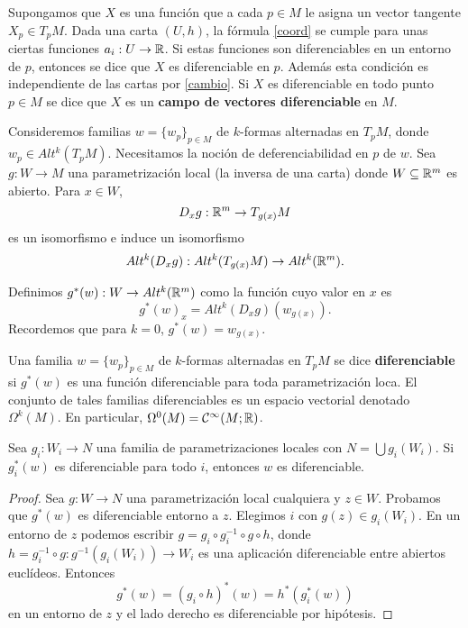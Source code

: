 \documentclass[CV.tex]{subfiles}
\begin{document}
Supongamos que $X$ es una función que a cada $p\in M$ le asigna un vector tangente $X_p\in T_pM$. Dada una carta $(U,h)$, la fórmula \ref{coord} se cumple para unas ciertas funciones $a_i:U\to\mathbb{R}$. Si estas funciones son diferenciables en un entorno de $p$, entonces se dice que $X$ es diferenciable en $p$. Además esta condición es independiente de las cartas por \ref{cambio}. Si $X$ es diferenciable en todo punto $p\in M$ se dice que $X$ es un \textbf{campo de vectores diferenciable} en $M$. 

Consideremos familias $w=\{w_p\}_{p\in M}$ de $k$-formas alternadas en $T_pM$, donde $w_p\in Alt^k(T_pM)$. Necesitamos la noción de deferenciabilidad en $p$ de $w$. Sea $g:W\to M$ una parametrización local (la inversa de una carta) donde $W\subseteq\mathbb{R}^m$ es abierto. Para $x\in W$,
\[
D_x g:\mathbb{R}^m\to T_{g(x)}M
\]
es un isomorfismo e induce un isomorfismo
\[
Alt^k(D_xg):Alt^k(T_{g(x)}M)\to Alt^k(\mathbb{R}^m).
\]

Definimos $g^*(w):W\to Alt^k(\mathbb{R}^m)$ como la función cuyo valor en $x$ es
\[
g^*(w)_x=Alt^k(D_xg)(w_{g(x)}).
\]
Recordemos que para $k=0$, $g^*(w)=w_{g(x)}$. 

\begin{defi}
Una familia $w=\{w_p\}_{p\in M}$ de $k$-formas alternadas en $T_pM$ se dice \textbf{diferenciable} si $g^*(w)$ es una función diferenciable para toda parametrización loca. El conjunto de tales familias diferenciables es un espacio vectorial denotado $\Omega^k(M)$. En particular, $\Omega^0(M)=\mathcal{C}^{\infty}(M;\mathbb{R})$. 
\end{defi}

\begin{lemma}
Sea $g_i:W_i\to N$ una familia de parametrizaciones locales con $N=\bigcup g_i(W_i)$. Si $g_i^*(w)$ es diferenciable para todo $i$, entonces $w$ es diferenciable.
\end{lemma}
\begin{proof}
Sea $g:W\to N$ una parametrización local cualquiera y $z\in W$. Probamos que $g^*(w)$ es diferenciable entorno a $z$. Elegimos $i$ con $g(z)\in g_i(W_i)$. En un entorno de $z$ podemos escribir $g=g_i\circ g_i^{-1}\circ g\circ h$, donde $h=g_i^{-1}\circ g:g^{-1}(g_i(W_i))\to W_i$ es una aplicación diferenciable entre abiertos euclídeos. Entonces
\[
g^*(w)=(g_i\circ h)^*(w)=h^*(g_i^*(w))
\]
en un entorno de $z$ y el lado derecho es diferenciable por hipótesis. 
\end{proof}
\end{document}
